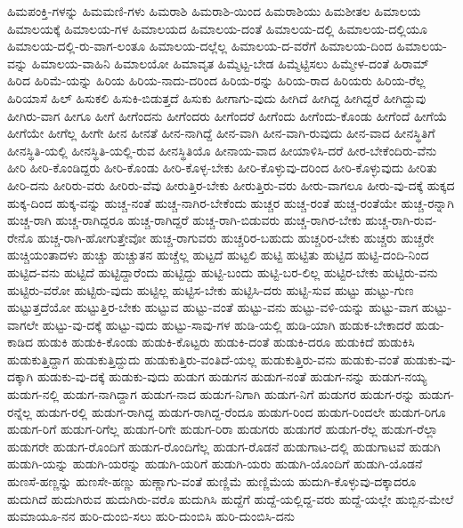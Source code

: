 {ಹಿಮಪಂಕ್ತಿ-ಗಳನ್ನು
ಹಿಮಮಣಿ-ಗಳು
ಹಿಮರಾಶಿ
ಹಿಮರಾಶಿ-ಯಿಂದ
ಹಿಮರಾಶಿಯು
ಹಿಮಶೀತಲ
ಹಿಮಾಲಯ
ಹಿಮಾಲಯಕ್ಕೆ
ಹಿಮಾಲಯ-ಗಳ
ಹಿಮಾಲಯದ
ಹಿಮಾಲಯ-ದಂತೆ
ಹಿಮಾಲಯ-ದಲ್ಲಿ
ಹಿಮಾಲಯ-ದಲ್ಲಿಯೂ
ಹಿಮಾಲಯ-ದಲ್ಲಿ-ರು-ವಾಗ-ಲಂತೂ
ಹಿಮಾಲಯ-ದಲ್ಲೆಲ್ಲ
ಹಿಮಾಲಯ-ದ-ವರೆಗೆ
ಹಿಮಾಲಯ-ದಿಂದ
ಹಿಮಾಲಯ-ವನ್ನು
ಹಿಮಾಲಯ-ವಾಹಿನಿ
ಹಿಮಾಲಯೋ
ಹಿಮಾವೃತ
ಹಿಮ್ಮೆಟ್ಟ-ಬೇಡ
ಹಿಮ್ಮೆಟ್ಟಿಸಲು
ಹಿಮ್ಮೇಳ-ದಂತೆ
ಹಿರಾಮ್
ಹಿರಿದ
ಹಿರಿಮೆ-ಯನ್ನು
ಹಿರಿಯ
ಹಿರಿಯ-ನಾದು-ದರಿಂದ
ಹಿರಿಯ-ರನ್ನು
ಹಿರಿಯ-ರಾದ
ಹಿರಿಯರು
ಹಿರಿಯ-ರೆಲ್ಲ
ಹಿರಿಯಾಸೆ
ಹಿಲ್
ಹಿಸುಕಲಿ
ಹಿಸುಕಿ-ಬಿಡುತ್ತದೆ
ಹಿಸುಕು
ಹೀಗಾಗು-ವುದು
ಹೀಗಿದೆ
ಹೀಗಿದ್ದ
ಹೀಗಿದ್ದರೆ
ಹೀಗಿದ್ದುವು
ಹೀಗಿರು-ವಾಗ
ಹೀಗೂ
ಹೀಗೆ
ಹೀಗೆಂದನು
ಹೀಗೆಂದರು
ಹೀಗೆಂದರೆ
ಹೀಗೆಂದು
ಹೀಗೆಂದು-ಕೊಂಡು
ಹೀಗೆಂದೆ
ಹೀಗೆಯೆ
ಹೀಗೆಯೇ
ಹೀಗೆಲ್ಲ
ಹೀಗೇ
ಹೀನ
ಹೀನತೆ
ಹೀನ-ನಾಗಿದ್ದೆ
ಹೀನ-ವಾಗಿ
ಹೀನ-ವಾಗಿ-ರುವುದು
ಹೀನ-ವಾದ
ಹೀನಸ್ಥಿತಿಗೆ
ಹೀನಸ್ಥಿತಿ-ಯಲ್ಲಿ
ಹೀನಸ್ಥಿತಿ-ಯಲ್ಲಿ-ರುವ
ಹೀನಸ್ಥಿತಿಯೊ
ಹೀನಾಯ-ವಾದ
ಹೀಯಾಳಿಸಿ-ದರೆ
ಹೀರ-ಬೇಕೆಂದಿರು-ವೆನು
ಹೀರಿ
ಹೀರಿ-ಕೊಂಡಿದ್ದರು
ಹೀರಿ-ಕೊಂಡು
ಹೀರಿ-ಕೊಳ್ಳ-ಬೇಕು
ಹೀರಿ-ಕೊಳ್ಳುವು-ದರಿಂದ
ಹೀರಿ-ಕೊಳ್ಳುವುದು
ಹೀರಿತು
ಹೀರಿ-ದನು
ಹೀರಿರು-ವರು
ಹೀರಿರು-ವೆವು
ಹೀರುತ್ತಿರ-ಬೇಕು
ಹೀರುತ್ತಿರು-ವರು
ಹೀರು-ವಾಗಲೂ
ಹೀರು-ವು-ದಕ್ಕೆ
ಹುಕ್ಕದ
ಹುಕ್ಕ-ದಿಂದ
ಹುಕ್ಕ-ವನ್ನು
ಹುಚ್ಚ-ನಂತೆ
ಹುಚ್ಚ-ನಾಗಿರ-ಬೇಕೆಂದು
ಹುಚ್ಚರ
ಹುಚ್ಚ-ರಂತೆ
ಹುಚ್ಚ-ರಂತೆಯೇ
ಹುಚ್ಚ-ರನ್ನಾಗಿ
ಹುಚ್ಚ-ರಾಗಿ
ಹುಚ್ಚ-ರಾಗಿದ್ದರೂ
ಹುಚ್ಚ-ರಾಗಿದ್ದರೆ
ಹುಚ್ಚ-ರಾಗಿ-ಬಿಡುವರು
ಹುಚ್ಚ-ರಾಗಿರ-ಬೇಕು
ಹುಚ್ಚ-ರಾಗಿ-ರುವ-ರೇನೊ
ಹುಚ್ಚ-ರಾಗಿ-ಹೋಗುತ್ತೇವೋ
ಹುಚ್ಚ-ರಾಗುವರು
ಹುಚ್ಚರಿರ-ಬಹುದು
ಹುಚ್ಚರಿರ-ಬೇಕು
ಹುಚ್ಚರು
ಹುಚ್ಚರೇ
ಹುಚ್ಚಿಯಂತಾದಳು
ಹುಚ್ಚು
ಹುಚ್ಚುತನ
ಹುಚ್ಚೆಲ್ಲ
ಹುಟ್ಟದೆ
ಹುಟ್ಟಲಿ
ಹುಟ್ಟಿ
ಹುಟ್ಟಿತು
ಹುಟ್ಟಿದ
ಹುಟ್ಟಿ-ದಂದಿ-ನಿಂದ
ಹುಟ್ಟಿದ-ವನು
ಹುಟ್ಟಿದೆ
ಹುಟ್ಟಿದ್ದಾರೆಂದು
ಹುಟ್ಟಿದ್ದು
ಹುಟ್ಟಿ-ಬಂದು
ಹುಟ್ಟಿ-ಬರ-ಲಿಲ್ಲ
ಹುಟ್ಟಿರ-ಬೇಕು
ಹುಟ್ಟಿರು-ವನು
ಹುಟ್ಟಿರು-ವರೋ
ಹುಟ್ಟಿರು-ವುದು
ಹುಟ್ಟಿಲ್ಲ
ಹುಟ್ಟಿಸ-ಬೇಕು
ಹುಟ್ಟಿಸಿ-ದರು
ಹುಟ್ಟಿ-ಸುವ
ಹುಟ್ಟು
ಹುಟ್ಟು-ಗುಣ
ಹುಟ್ಟುತ್ತದೆಯೋ
ಹುಟ್ಟುತ್ತಿರ-ಬೇಕು
ಹುಟ್ಟುವ
ಹುಟ್ಟು-ವಂತೆ
ಹುಟ್ಟು-ವನು
ಹುಟ್ಟು-ವಳಿ-ಯನ್ನು
ಹುಟ್ಟು-ವಾಗ
ಹುಟ್ಟು-ವಾಗಲೇ
ಹುಟ್ಟು-ವು-ದಕ್ಕೆ
ಹುಟ್ಟು-ವುದು
ಹುಟ್ಟು-ಸಾವು-ಗಳ
ಹುಡಿ-ಯಲ್ಲಿ
ಹುಡಿ-ಯಾಗಿ
ಹುಡುಕ-ಬೇಕಾದರೆ
ಹುಡು-ಕಾಡಿದ
ಹುಡುಕಿ
ಹುಡುಕಿ-ಕೊಂಡು
ಹುಡುಕಿ-ಕೊಟ್ಟರು
ಹುಡುಕಿ-ದಂತೆ
ಹುಡುಕಿ-ದರೂ
ಹುಡುಕಿದೆ
ಹುಡುಕಿಸಿ
ಹುಡುಕುತ್ತಿದ್ದಾಗ
ಹುಡುಕುತ್ತಿದ್ದುದು
ಹುಡುಕುತ್ತಿರು-ವಂತಿದೆ-ಯಲ್ಲ
ಹುಡುಕುತ್ತಿರು-ವನು
ಹುಡುಕು-ವಂತೆ
ಹುಡುಕು-ವು-ದಕ್ಕಾಗಿ
ಹುಡುಕು-ವು-ದಕ್ಕೆ
ಹುಡುಕು-ವುದು
ಹುಡುಗ
ಹುಡುಗನ
ಹುಡುಗ-ನಂತೆ
ಹುಡುಗ-ನನ್ನು
ಹುಡುಗ-ನಯ್ಯ
ಹುಡುಗ-ನಲ್ಲಿ
ಹುಡುಗ-ನಾಗಿದ್ದಾಗ
ಹುಡುಗ-ನಾದ
ಹುಡುಗ-ನಿಗಾಗಿ
ಹುಡುಗ-ನಿಗೆ
ಹುಡುಗರ
ಹುಡುಗ-ರನ್ನು
ಹುಡುಗ-ರನ್ನೆಲ್ಲ
ಹುಡುಗ-ರಲ್ಲಿ
ಹುಡುಗ-ರಾಗಿದ್ದ
ಹುಡುಗ-ರಾಗಿದ್ದ-ರೆಂದೂ
ಹುಡುಗ-ರಿಂದ
ಹುಡುಗ-ರಿಂದಲೇ
ಹುಡುಗ-ರಿಗೂ
ಹುಡುಗ-ರಿಗೆ
ಹುಡುಗ-ರಿಗೆಲ್ಲ
ಹುಡುಗ-ರಿಗೇ
ಹುಡುಗ-ರಿರಾ
ಹುಡುಗರು
ಹುಡುಗರೆ
ಹುಡುಗ-ರೆಲ್ಲ
ಹುಡುಗ-ರೆಲ್ಲಾ
ಹುಡುಗರೇ
ಹುಡುಗ-ರೊಂದಿಗೆ
ಹುಡುಗ-ರೊಂದಿಗೆಲ್ಲ
ಹುಡುಗ-ರೊಡನೆ
ಹುಡುಗಾಟ-ದಲ್ಲಿ
ಹುಡುಗಾಟವೆ
ಹುಡುಗಿ
ಹುಡುಗಿ-ಯನ್ನು
ಹುಡುಗಿ-ಯರನ್ನು
ಹುಡುಗಿ-ಯರಿಗೆ
ಹುಡುಗಿ-ಯರು
ಹುಡುಗಿ-ಯೊಂದಿಗೆ
ಹುಡುಗಿ-ಯೊಡನೆ
ಹುಣಸೆ-ಹಣ್ಣನ್ನು
ಹುಣಸೇ-ಹಣ್ಣು
ಹುಣ್ಣಾಗು-ವಂತೆ
ಹುಣ್ಣಿಮೆ
ಹುಣ್ಣಿಮೆಯ
ಹುದುಗಿ-ಕೊಳ್ಳುವು-ದಕ್ಕಾದರೂ
ಹುದುಗಿದೆ
ಹುದುಗಿರುವ
ಹುದುಗಿರು-ವರೊ
ಹುದುಗಿಸಿ
ಹುದ್ದೆಗೆ
ಹುದ್ದೆ-ಯಲ್ಲಿದ್ದ-ವರು
ಹುದ್ದೆ-ಯಲ್ಲೇ
ಹುಬ್ಬಿನ-ಮೇಲೆ
ಹುಮಾಯೂ-ನನ
ಹುರಿ-ದುಂಬಿ-ಸಲು
ಹುರಿ-ದುಂಬಿಸಿ
ಹುರಿ-ದುಂಬಿಸಿ-ದನು
}
